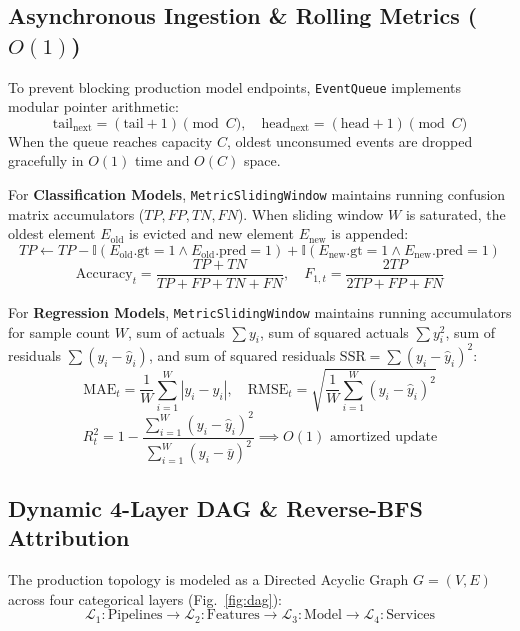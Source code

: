 \documentclass[conference]{IEEEtran}
\begin{document}
\subsection{Asynchronous Ingestion \& Rolling Metrics ($O(1)$)}
To prevent blocking production model endpoints, \texttt{EventQueue} implements modular pointer arithmetic:
\begin{equation}
\text{tail}_{\text{next}} = (\text{tail} + 1) \pmod C, \quad \text{head}_{\text{next}} = (\text{head} + 1) \pmod C
\end{equation}
When the queue reaches capacity $C$, oldest unconsumed events are dropped gracefully in $O(1)$ time and $O(C)$ space.

For \textbf{Classification Models}, \texttt{MetricSlidingWindow} maintains running confusion matrix accumulators ($TP, FP, TN, FN$). When sliding window $W$ is saturated, the oldest element $E_{\text{old}}$ is evicted and new element $E_{\text{new}}$ is appended:
\begin{equation}
TP \gets TP - \mathbb{I}(E_{\text{old}}.\text{gt}=1 \land E_{\text{old}}.\text{pred}=1) + \mathbb{I}(E_{\text{new}}.\text{gt}=1 \land E_{\text{new}}.\text{pred}=1)
\end{equation}
\begin{equation}
\text{Accuracy}_t = \frac{TP + TN}{TP + FP + TN + FN}, \quad F_{1, t} = \frac{2TP}{2TP + FP + FN}
\end{equation}

For \textbf{Regression Models}, \texttt{MetricSlidingWindow} maintains running accumulators for sample count $W$, sum of actuals $\sum y_i$, sum of squared actuals $\sum y_i^2$, sum of residuals $\sum (y_i - \hat{y}_i)$, and sum of squared residuals $\text{SSR} = \sum (y_i - \hat{y}_i)^2$:
\begin{equation}
\text{MAE}_t = \frac{1}{W} \sum_{i=1}^W |y_i - \hat{y}_i|, \quad \text{RMSE}_t = \sqrt{\frac{1}{W} \sum_{i=1}^W (y_i - \hat{y}_i)^2}
\end{equation}
\begin{equation}
R^2_t = 1 - \frac{\sum_{i=1}^W (y_i - \hat{y}_i)^2}{\sum_{i=1}^W (y_i - \bar{y})^2} \implies O(1) \text{ amortized update}
\end{equation}

\subsection{Dynamic 4-Layer DAG \& Reverse-BFS Attribution}
The production topology is modeled as a Directed Acyclic Graph $G = (V, E)$ across four categorical layers (Fig.~\ref{fig:dag}):
\begin{equation}
\mathcal{L}_1: \text{Pipelines} \to \mathcal{L}_2: \text{Features} \to \mathcal{L}_3: \text{Model} \to \mathcal{L}_4: \text{Services}
\end{equation}
\end{document}
